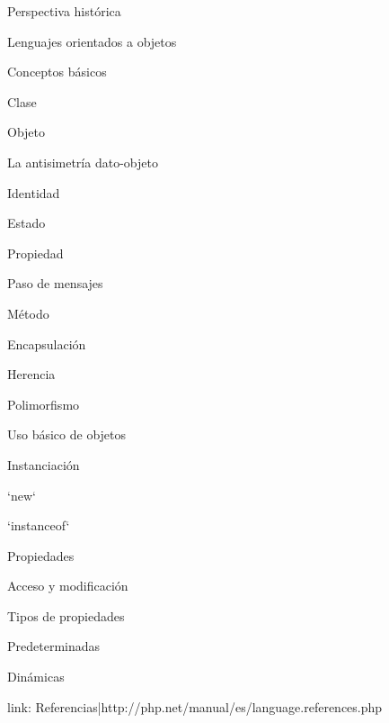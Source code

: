 \begin{longenum}
\begin{longenum}
        \begin{longenum}
            \item Perspectiva histórica
            \item Lenguajes orientados a objetos
        \end{longenum}
        \item Conceptos básicos
        \begin{longenum}
            \item Clase
            \item Objeto
            \begin{longenum}
                \item La antisimetría dato-objeto
            \end{longenum}
            \item Identidad
            \item Estado
            \item Propiedad
            \item Paso de mensajes
            \item Método
            \item Encapsulación
            \item Herencia
            \item Polimorfismo
        \end{longenum}
        \item Uso básico de objetos
        \begin{longenum}
            \item Instanciación
            \begin{longenum}
                \item `new`
                \item `instanceof`
            \end{longenum}
            \item Propiedades
            \begin{longenum}
                \item Acceso y modificación
                \item Tipos de propiedades
                \begin{longenum}
                    \item Predeterminadas
                    \item Dinámicas
                \end{longenum}
            \end{longenum}
            \item [link: Referencias|http://php.net/manual/es/language.references.php]

\end{longenum}
\end{longenum}
\end{longenum}
